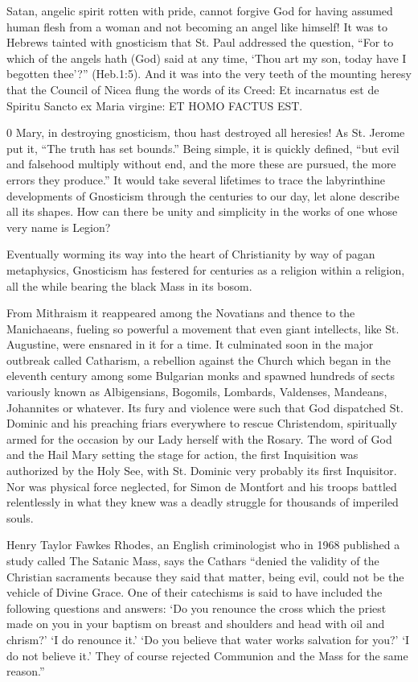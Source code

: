 Satan, angelic spirit rotten with pride, cannot forgive God for having assumed human flesh from a woman and not becoming an angel like himself! It was to Hebrews tainted with gnosticism that St. Paul addressed the question, ``For to which of the angels hath (God) said at any time, `Thou art my son, today have I begotten thee'?'' (Heb.1:5). And it was into the very teeth of the mounting heresy that the Council of Nicea flung the words of its Creed: Et incarnatus est de Spiritu Sancto ex Maria virgine: ET HOMO FACTUS EST.

0 Mary, in destroying gnosticism, thou hast destroyed all heresies! As St. Jerome put it, ``The truth has set bounds.'' Being simple, it is quickly defined, ``but evil and falsehood multiply without end, and the more these are pursued, the more errors they produce.'' It would take several lifetimes to trace the labyrinthine developments of Gnosticism through the centuries to our day, let alone describe all its shapes. How can there be unity and simplicity in the works of one whose very name is Legion?

Eventually worming its way into the heart of Christianity by way of pagan metaphysics, Gnosticism has festered for centuries as a religion within a religion, all the while bearing the black Mass in its bosom.

From Mithraism it reappeared among the Novatians and thence to the Manichaeans, fueling so powerful a movement that even giant intellects, like St. Augustine, were ensnared in it for a time. It culminated soon in the major outbreak called Catharism, a rebellion against the Church which began in the eleventh century among some Bulgarian monks and spawned hundreds of sects variously known as Albigensians, Bogomils, Lombards, Valdenses, Mandeans, Johannites or whatever. Its fury and violence were such that God dispatched St. Dominic and his preaching friars everywhere to rescue Christendom, spiritually armed for the occasion by our Lady herself with the Rosary. The word of God and the Hail Mary setting the stage for action, the first Inquisition was authorized by the Holy See, with St. Dominic very probably its first Inquisitor. Nor was physical force neglected, for Simon de Montfort and his troops battled relentlessly in what they knew was a deadly struggle for thousands of imperiled souls.

Henry Taylor Fawkes Rhodes, an English criminologist who in 1968 published a study called The Satanic Mass, says the Cathars ``denied the validity of the Christian sacraments because they said that matter, being evil, could not be the vehicle of Divine Grace. One of their catechisms is said to have included the following questions and answers: `Do you renounce the cross which the priest made on you in your baptism on breast and shoulders and head with oil and chrism?' `I do renounce it.' `Do you believe that water works salvation for you?' `I do not believe it.' They of course rejected Communion and the Mass for the same reason.''

